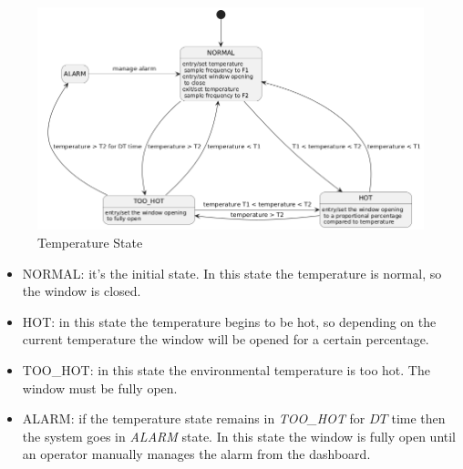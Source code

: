 \documentclass[a4paper,12pt]{report}
\begin{document}
            \begin{figure}[H]
                \centering{}
                \includegraphics[width=\textwidth]{uml/img/TemperatureStateUML.png}
                \caption{Temperature State}
                \label{img:temperature_state}
            \end{figure}

            \begin{itemize}
                \item NORMAL: it's the initial state. In this state the temperature is normal, so the window is closed.
                \item HOT: in this state the temperature begins to be hot, so depending on the current temperature the window will be 
                opened for a certain percentage.
                \item TOO\_HOT: in this state the environmental temperature is too hot. The window must be fully open.
                \item ALARM: if the temperature state remains in \textit{TOO\_HOT} for $DT$ time then the system goes in \textit{ALARM} 
                state. In this state the window is fully open until an operator manually manages the alarm from the dashboard.
            \end{itemize}

    
\end{document}
